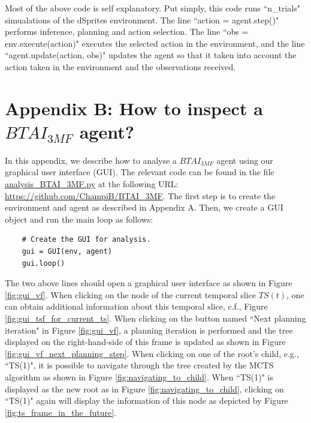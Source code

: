 \documentclass[twoside,11pt]{article}
\begin{document}
Most of the above code is self explanatory. Put simply, this code runs ``n\_trials" simualations of the dSprites environment. The line ``action = agent.step()" performs inference, planning and action selection. The line ``obs = env.execute(action)" executes the selected action in the environment, and the line ``agent.update(action, obs)" updates the agent so that it taken into account the action taken in the environment and the observations received.

\section*{Appendix B: How to inspect a $BTAI_{3MF}$ agent?}

In this appendix, we describe how to analyse a $BTAI_{3MF}$ agent using our graphical user interface (GUI). The relevant code can be found in the file \url{analysis_BTAI_3MF.py} at the following URL: \url{https://github.com/ChampiB/BTAI_3MF}. The first step is to create the environment and agent as described in Appendix A. Then, we create a GUI object and run the main loop as follows:
\begin{verbatim}
    # Create the GUI for analysis.
    gui = GUI(env, agent)
    gui.loop()
\end{verbatim}
The two above lines should open a graphical user interface as shown in Figure \ref{fig:gui_vf}. When clicking on the node of the current temporal slice $TS(t)$, one can obtain additional information about this temporal slice, c.f., Figure \ref{fig:gui_tsf_for_current_ts}. When clicking on the button named ``Next planning iteration" in Figure \ref{fig:gui_vf}, a planning iteration is performed and the tree displayed on the right-hand-side of this frame is updated as shown in Figure \ref{fig:gui_vf_next_planning_step}. When clicking on one of the root's child, e.g., ``TS(1)", it is possible to navigate through the tree created by the MCTS algorithm as shown in Figure \ref{fig:navigating_to_child}. When ``TS(1)" is displayed as the new root as in Figure \ref{fig:navigating_to_child}, clicking on ``TS(1)" again will display the information of this node as depicted by Figure \ref{fig:ts_frame_in_the_future}. 
\end{document}
